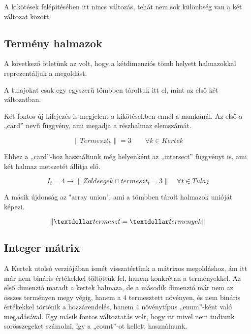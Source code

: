 \documentclass[12pt,a4paper,twoside, openright]{report}
\begin{document}
    A kikötések felépítésében itt nincs változás, tehát nem sok különbség van a két változat között.

\subsection{Termény halmazok}

    A következő ötletünk az volt, hogy a kétdimenziós tömb helyett halmazokkal reprezentáljuk a megoldást.


    A tulajokat csak egy egyszerű tömbben tároltuk itt el, mint az első két változatban.

    Két fontos új kifejezés is megjelent a kikötésekben ennél a munkánál.
    Az első a „card” nevű függvény, ami megadja a részhalmaz elemszámát.

    \begin{equation}
    \left\| Termeszt_k \right\| =3 \qquad \forall k \in Kertek
    \end{equation}

    Ehhez a „card”-hoz használtunk még helyenként az „intersect” függvényt is, ami két halmaz metszetét állítja elő.

    \begin{equation}
    I_t=4 \rightarrow \left\| Zoldsegek \cap termeszt_t =3 \right\| \quad \forall t \in Tulaj
    \end{equation}

    A másik újdonság az "array union", ami a tömbben tárolt halmazok unióját képezi.
    
    \begin{equation}
     \left\| \textdollar termeszt= \textdollar termenyek \right\| 
    \end{equation}

\subsection{Integer mátrix}

    A Kertek utolsó verziójában ismét visszatértünk a mátrixos megoldáshoz, ám itt már nem bináris értékekkel töltöttük fel, hanem konkrétan a terményekkel.
    Az első dimenzió maradt a kertek halmaza, de a második dimenzió már nem az összes terményen megy végig, hanem a 4 termesztett növényen, és nem bináris értékekkel történik a hozzárendelés, hanem 4 növénytípus „enum”-ként való megadásával.
    Egy másik fontos változtatás volt, hogy itt mivel nem tudtunk sorösszegeket számolni, így a „count”-ot kellett használnunk.
\end{document}
